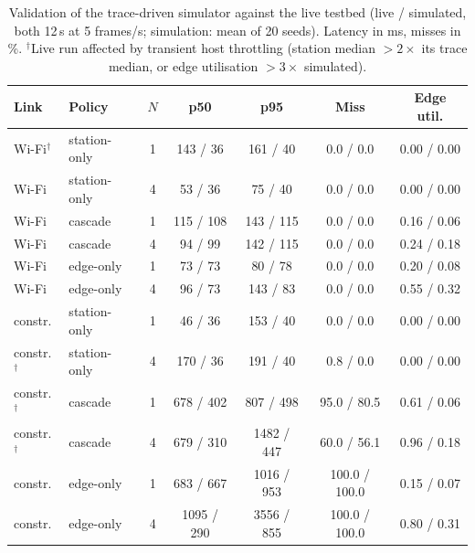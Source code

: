 \begin{table}[t]
\centering
\caption{Validation of the trace-driven simulator against the live testbed (live / simulated, both 12\,s at 5 frames/s; simulation: mean of 20 seeds). Latency in ms, misses in \%. $^\dagger$Live run affected by transient host throttling (station median $>2\times$ its trace median, or edge utilisation $>3\times$ simulated).}
\label{tab:validation}
\scriptsize
\setlength{\tabcolsep}{2pt}
\begin{tabular}{@{}llccccc@{}}
\toprule
Link & Policy & $N$ & p50 & p95 & Miss & Edge util. \\
\midrule
Wi-Fi$^\dagger$ & station-only & 1 & 143 / 36 & 161 / 40 & 0.0 / 0.0 & 0.00 / 0.00 \\
Wi-Fi & station-only & 4 & 53 / 36 & 75 / 40 & 0.0 / 0.0 & 0.00 / 0.00 \\
Wi-Fi & cascade & 1 & 115 / 108 & 143 / 115 & 0.0 / 0.0 & 0.16 / 0.06 \\
Wi-Fi & cascade & 4 & 94 / 99 & 142 / 115 & 0.0 / 0.0 & 0.24 / 0.18 \\
Wi-Fi & edge-only & 1 & 73 / 73 & 80 / 78 & 0.0 / 0.0 & 0.20 / 0.08 \\
Wi-Fi & edge-only & 4 & 96 / 73 & 143 / 83 & 0.0 / 0.0 & 0.55 / 0.32 \\
constr. & station-only & 1 & 46 / 36 & 153 / 40 & 0.0 / 0.0 & 0.00 / 0.00 \\
constr.$^\dagger$ & station-only & 4 & 170 / 36 & 191 / 40 & 0.8 / 0.0 & 0.00 / 0.00 \\
constr.$^\dagger$ & cascade & 1 & 678 / 402 & 807 / 498 & 95.0 / 80.5 & 0.61 / 0.06 \\
constr.$^\dagger$ & cascade & 4 & 679 / 310 & 1482 / 447 & 60.0 / 56.1 & 0.96 / 0.18 \\
constr. & edge-only & 1 & 683 / 667 & 1016 / 953 & 100.0 / 100.0 & 0.15 / 0.07 \\
constr. & edge-only & 4 & 1095 / 290 & 3556 / 855 & 100.0 / 100.0 & 0.80 / 0.31 \\
\bottomrule
\end{tabular}
\end{table}
